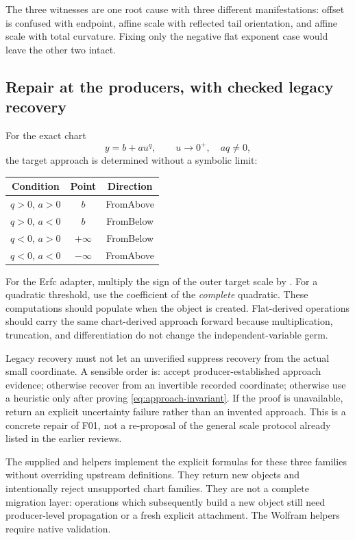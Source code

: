 The three witnesses are one root cause with three different manifestations: offset is confused with endpoint, affine scale with reflected tail orientation, and affine scale with total curvature. Fixing only the negative flat exponent case would leave the other two intact.

\subsection{Repair at the producers, with checked legacy recovery}

For the exact chart
\begin{equation}\label{eq:monomial-chart}
 y=b+a u^q,\qquad u\to0^+,\quad a q\ne0,
\end{equation}
the target approach is determined without a symbolic limit:
\begin{center}
\begin{tabular}{@{}ccc@{}}\toprule
Condition & Point & Direction\\\midrule
$q>0$, $a>0$ & $b$ & FromAbove\\
$q>0$, $a<0$ & $b$ & FromBelow\\
$q<0$, $a>0$ & $+\infty$ & FromBelow\\
$q<0$, $a<0$ & $-\infty$ & FromAbove\\\bottomrule
\end{tabular}
\end{center}
For the Erfc adapter, multiply the sign of the outer target scale by . For a quadratic threshold, use the coefficient of the \emph{complete} quadratic. These computations should populate  when the object is created. Flat-derived operations should carry the same chart-derived approach forward because multiplication, truncation, and differentiation do not change the independent-variable germ.

Legacy recovery must not let an unverified  suppress recovery from the actual small coordinate. A sensible order is: accept producer-established approach evidence; otherwise recover from an invertible recorded coordinate; otherwise use a heuristic only after proving \eqref{eq:approach-invariant}. If the proof is unavailable, return an explicit uncertainty failure rather than an invented approach. This is a concrete repair of F01, not a re-proposal of the general scale protocol already listed in the earlier reviews.

The supplied  and  helpers implement the explicit formulas for these three families without overriding upstream definitions. They return new objects and intentionally reject unsupported chart families. They are not a complete migration layer: operations which subsequently build a new object still need producer-level propagation or a fresh explicit attachment. The Wolfram helpers require native validation.

